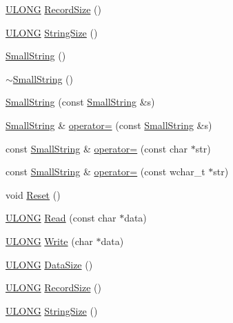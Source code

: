 \begin{DoxyCompactItemize}
\item 
\hyperlink{_basic_excel_8hpp_abe09d1bea023be6a07cbadde8e955435}{U\+L\+O\+N\+G} \hyperlink{struct_y_excel_1_1_small_string_adc7d0b59d339495ff727dc599b14f9f9}{Record\+Size} ()
\item 
\hyperlink{_basic_excel_8hpp_abe09d1bea023be6a07cbadde8e955435}{U\+L\+O\+N\+G} \hyperlink{struct_y_excel_1_1_small_string_a8c7553f750a44bb513e221b5755bf0e1}{String\+Size} ()
\item 
\hyperlink{struct_y_excel_1_1_small_string_a5e14f04bfdfcb18ae102a51ca56bb5b9}{Small\+String} ()
\item 
\hyperlink{struct_y_excel_1_1_small_string_ac08fc1975549d73e76f8fede26f7df32}{$\sim$\+Small\+String} ()
\item 
\hyperlink{struct_y_excel_1_1_small_string_a43392143c24f2cc2d638d95c48ec14b7}{Small\+String} (const \hyperlink{struct_y_excel_1_1_small_string}{Small\+String} \&s)
\item 
\hyperlink{struct_y_excel_1_1_small_string}{Small\+String} \& \hyperlink{struct_y_excel_1_1_small_string_ae70da570df610709920937a0af04bb07}{operator=} (const \hyperlink{struct_y_excel_1_1_small_string}{Small\+String} \&s)
\item 
const \hyperlink{struct_y_excel_1_1_small_string}{Small\+String} \& \hyperlink{struct_y_excel_1_1_small_string_a4d0825fa25bf9eded0d9dfd46bf6f584}{operator=} (const char $\ast$str)
\item 
const \hyperlink{struct_y_excel_1_1_small_string}{Small\+String} \& \hyperlink{struct_y_excel_1_1_small_string_ab90adf6ab6c3cc7d6daf0a832445c88f}{operator=} (const wchar\+\_\+t $\ast$str)
\item 
void \hyperlink{struct_y_excel_1_1_small_string_a56c6858401c4fb21fa1bd4dd8c7da420}{Reset} ()
\item 
\hyperlink{_basic_excel_8hpp_abe09d1bea023be6a07cbadde8e955435}{U\+L\+O\+N\+G} \hyperlink{struct_y_excel_1_1_small_string_acd78382b8d66e34bc669b094c4cd52df}{Read} (const char $\ast$data)
\item 
\hyperlink{_basic_excel_8hpp_abe09d1bea023be6a07cbadde8e955435}{U\+L\+O\+N\+G} \hyperlink{struct_y_excel_1_1_small_string_a3ffb2e72c35b0c42eefd218f91241aa1}{Write} (char $\ast$data)
\item 
\hyperlink{_basic_excel_8hpp_abe09d1bea023be6a07cbadde8e955435}{U\+L\+O\+N\+G} \hyperlink{struct_y_excel_1_1_small_string_a29a58935661b85f687245ebae82d5dde}{Data\+Size} ()
\item 
\hyperlink{_basic_excel_8hpp_abe09d1bea023be6a07cbadde8e955435}{U\+L\+O\+N\+G} \hyperlink{struct_y_excel_1_1_small_string_adc7d0b59d339495ff727dc599b14f9f9}{Record\+Size} ()
\item 
\hyperlink{_basic_excel_8hpp_abe09d1bea023be6a07cbadde8e955435}{U\+L\+O\+N\+G} \hyperlink{struct_y_excel_1_1_small_string_a8c7553f750a44bb513e221b5755bf0e1}{String\+Size} ()
\end{DoxyCompactItemize}
